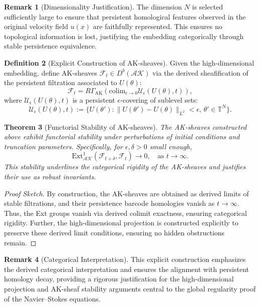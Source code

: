 \documentclass[11pt]{article}
\newtheorem{theorem}{Theorem}[section]
\theoremstyle{definition}
\newtheorem{definition}[theorem]{Definition}
\newtheorem{remark}[theorem]{Remark}
\begin{document}
\begin{remark}[Dimensionality Justification]
The dimension \( N \) is selected sufficiently large to ensure that persistent homological features observed in the original velocity field \( u(x) \) are faithfully represented. This ensures no topological information is lost, justifying the embedding categorically through stable persistence equivalence.
\end{remark}

\begin{definition}[Explicit Construction of AK-sheaves]
Given the high-dimensional embedding, define AK-sheaves \( \mathcal{F}_t \in D^b(\mathcal{AK}) \) via the derived sheafification of the persistent filtration associated to \( U(\theta) \):
\[
\mathcal{F}_t = R\Gamma_\mathrm{AK}\left(\mathrm{colim}_{\epsilon \to 0} \mathcal{U}_\epsilon(U(\theta),t)\right),
\]
where \( \mathcal{U}_\epsilon(U(\theta),t) \) is a persistent \( \epsilon \)-covering of sublevel sets:
\[
\mathcal{U}_\epsilon(U(\theta),t) := \{U(\theta') : \|U(\theta') - U(\theta)\|_{L^2} < \epsilon,\,\theta'\in\mathbb{T}^N\}.
\]
\end{definition}

\begin{theorem}[Functorial Stability of AK-sheaves]
The AK-sheaves constructed above exhibit functorial stability under perturbations of initial conditions and truncation parameters. Specifically, for \( \epsilon,\delta > 0 \) small enough,
\[
\mathrm{Ext}^1_{\mathcal{AK}}(\mathcal{F}_{t+\delta},\mathcal{F}_t) \rightarrow 0, \quad \text{as } t\rightarrow\infty.
\]
This stability underlines the categorical rigidity of the AK-sheaves and justifies their use as robust invariants.
\end{theorem}

\begin{proof}[Proof Sketch]
By construction, the AK-sheaves are obtained as derived limits of stable filtrations, and their persistence barcode homologies vanish as \( t\rightarrow \infty \). Thus, the Ext groups vanish via derived colimit exactness, ensuring categorical rigidity. Further, the high-dimensional projection is constructed explicitly to preserve these derived limit conditions, ensuring no hidden obstructions remain.
\end{proof}

\begin{remark}[Categorical Interpretation]
This explicit construction emphasizes the derived categorical interpretation and ensures the alignment with persistent homology decay, providing a rigorous justification for the high-dimensional projection and AK-sheaf stability arguments central to the global regularity proof of the Navier--Stokes equations.
\end{remark}
\end{document}

